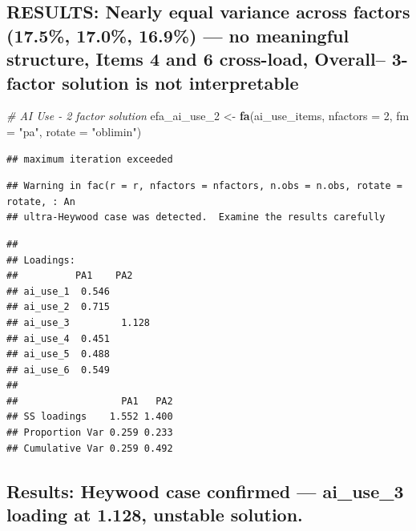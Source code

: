 \documentclass[
]{article}
\newenvironment{Shaded}{\begin{snugshade}}{\end{snugshade}}
\newcommand{\AttributeTok}[1]{\textcolor[rgb]{0.13,0.29,0.53}{#1}}
\newcommand{\CommentTok}[1]{\textcolor[rgb]{0.56,0.35,0.01}{\textit{#1}}}
\newcommand{\DecValTok}[1]{\textcolor[rgb]{0.00,0.00,0.81}{#1}}
\newcommand{\FloatTok}[1]{\textcolor[rgb]{0.00,0.00,0.81}{#1}}
\newcommand{\FunctionTok}[1]{\textcolor[rgb]{0.13,0.29,0.53}{\textbf{#1}}}
\newcommand{\NormalTok}[1]{#1}
\newcommand{\OtherTok}[1]{\textcolor[rgb]{0.56,0.35,0.01}{#1}}
\newcommand{\SpecialCharTok}[1]{\textcolor[rgb]{0.81,0.36,0.00}{\textbf{#1}}}
\newcommand{\StringTok}[1]{\textcolor[rgb]{0.31,0.60,0.02}{#1}}
\begin{document}
\subsection{RESULTS: Nearly equal variance across factors (17.5\%,
17.0\%, 16.9\%) --- no meaningful structure, Items 4 and 6 cross-load,
Overall-- 3-factor solution is not
interpretable}\label{results-nearly-equal-variance-across-factors-17.5-17.0-16.9-no-meaningful-structure-items-4-and-6-cross-load-overall-3-factor-solution-is-not-interpretable}

\begin{Shaded}
\begin{Highlighting}[]
\CommentTok{\# AI Use {-} 2 factor solution}
\NormalTok{efa\_ai\_use\_2 }\OtherTok{\textless{}{-}} \FunctionTok{fa}\NormalTok{(ai\_use\_items, }\AttributeTok{nfactors =} \DecValTok{2}\NormalTok{, }\AttributeTok{fm =} \StringTok{"pa"}\NormalTok{, }\AttributeTok{rotate =} \StringTok{"oblimin"}\NormalTok{)}
\end{Highlighting}
\end{Shaded}

\begin{verbatim}
## maximum iteration exceeded
\end{verbatim}

\begin{verbatim}
## Warning in fac(r = r, nfactors = nfactors, n.obs = n.obs, rotate = rotate, : An
## ultra-Heywood case was detected.  Examine the results carefully
\end{verbatim}

\begin{Shaded}
\end{Shaded}

\begin{verbatim}
## 
## Loadings:
##          PA1    PA2   
## ai_use_1  0.546       
## ai_use_2  0.715       
## ai_use_3         1.128
## ai_use_4  0.451       
## ai_use_5  0.488       
## ai_use_6  0.549       
## 
##                  PA1   PA2
## SS loadings    1.552 1.400
## Proportion Var 0.259 0.233
## Cumulative Var 0.259 0.492
\end{verbatim}

\subsection{Results: Heywood case confirmed --- ai\_use\_3 loading at
1.128, unstable
solution.}\label{results-heywood-case-confirmed-ai_use_3-loading-at-1.128-unstable-solution.}
\end{document}
